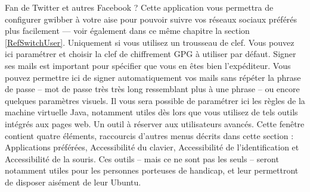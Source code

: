 Fan de Twitter et autres Facebook ? Cette application vous permettra de configurer gwibber à votre aise pour pouvoir suivre vos réseaux sociaux préférés plus facilement --- voir également dans ce même chapitre la section \ref{RefSwitchUser}.
Uniquement si vous utilisez un trousseau de clef. Vous pouvez ici paramétrer et choisir la clef de chiffrement GPG à utiliser par défaut. Signer ses mails est important pour spécifier que vous en êtes bien l'expéditeur. Vous pouvez permettre ici de signer automatiquement vos mails sans répéter la phrase de passe -- mot de passe très très long ressemblant plus à une phrase -- ou encore quelques paramètres visuels.
{}
Il vous sera possible de paramétrer ici les règles de la machine virtuelle Java, notamment utiles dès lors que vous utilisez de tels outils intégrés aux pages web. Un outil à réserver aux utilisateurs avancés.
Cette fenêtre contient quatre éléments, raccourcis d'autres menus décrits dans cette section : Applications préférées, Accessibilité du clavier, Accessibilité de l'identification et Accessibilité de la souris. Ces outils -- mais ce ne sont pas les seuls -- seront notamment utiles pour les personnes porteuses de handicap, et leur permettront de disposer aisément de leur Ubuntu.
